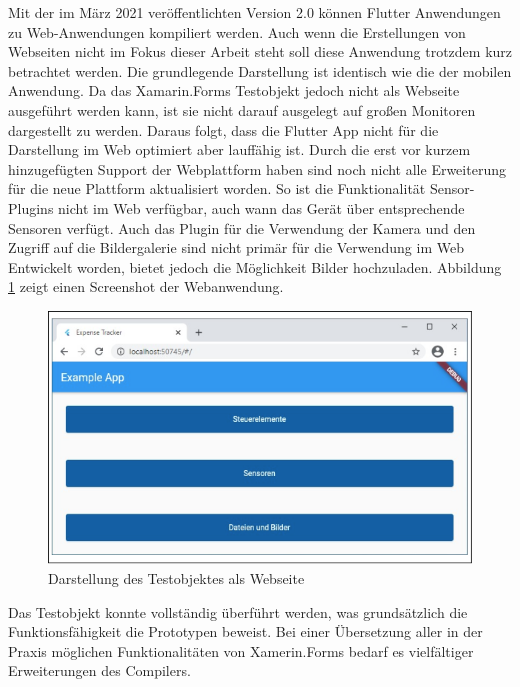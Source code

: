 Mit der im März 2021 veröffentlichten Version 2.0  können Flutter Anwendungen zu Web-Anwendungen kompiliert werden.  Auch wenn die Erstellungen von Webseiten nicht im Fokus dieser Arbeit steht soll diese Anwendung trotzdem kurz betrachtet werden.  Die grundlegende Darstellung ist identisch wie die der mobilen Anwendung.  Da das Xamarin.Forms Testobjekt jedoch nicht als Webseite ausgeführt werden kann,  ist sie nicht darauf ausgelegt auf großen Monitoren dargestellt zu werden.   Daraus folgt,  dass die Flutter App nicht für die Darstellung im Web optimiert aber lauffähig ist.  Durch die erst vor kurzem hinzugefügten Support der Webplattform haben sind noch nicht alle Erweiterung für die neue Plattform aktualisiert worden.  So ist die Funktionalität Sensor-Plugins nicht im Web verfügbar,  auch wann das Gerät über entsprechende Sensoren verfügt.  Auch das Plugin für die Verwendung der Kamera und den Zugriff auf die Bildergalerie sind nicht primär für die Verwendung im Web Entwickelt worden,  bietet jedoch die Möglichkeit Bilder hochzuladen.  Abbildung \ref{fig:WebView} zeigt einen Screenshot der Webanwendung.

\begin{figure}[!ht]
 \includegraphics[width=\textwidth,keepaspectratio]{Images/Implementation/WebApp.png}
 \caption{Darstellung des Testobjektes als Webseite}
 \label{fig:WebView}
\end{figure}


Das Testobjekt konnte vollständig überführt werden, was grundsätzlich die 
Funktionsfähigkeit die Prototypen beweist. Bei einer Übersetzung aller in der Praxis möglichen 
Funktionalitäten von Xamerin.Forms bedarf es vielfältiger Erweiterungen des Compilers.


